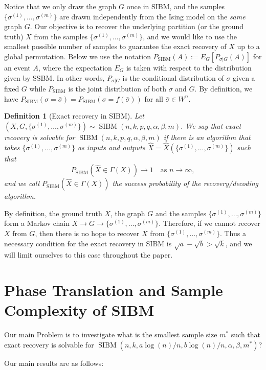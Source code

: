 \documentclass[conference]{IEEEtran}
\newtheorem{definition}{Definition}%
\DeclareMathOperator{\SIBM}{SIBM}
\begin{document}
Notice that we only draw the graph $G$ once in SIBM, and the samples $\{\sigma^{(1)},\dots,\sigma^{(m)}\}$ are drawn independently from the Ising model on the {\em same} graph $G$.
Our objective is to recover the underlying partition (or the ground truth) $X$ from the samples $\{\sigma^{(1)},\dots,\sigma^{(m)}\}$, and we would like to use the smallest possible number of samples to guarantee the exact recovery of $X$ up to a global permutation.
Below we use the notation $P_{\SIBM}(A):=E_G[P_{\sigma|G}(A)]$ for an event $A$, where the expectation $E_G$ is taken with respect to the distribution given by SSBM. In other words, $P_{\sigma|G}$ is the conditional distribution of  $\sigma$ given a fixed $G$ while $P_{\SIBM}$ is the joint distribution of both $\sigma$ and $G$.
By definition, we have $P_{\SIBM}(\sigma=\bar{\sigma})=P_{\SIBM}(\sigma=f(\bar{\sigma}))$ for all $\bar{\sigma}\in W^n$.


\begin{definition}[Exact recovery in SIBM]
Let $(X,G,\{\sigma^{(1)},\dots,\sigma^{(m)}\}) \sim \SIBM(n,k,p,q,\alpha,\beta,m)$.
We say that exact recovery is solvable for $\SIBM(n,k,p,q,\alpha,\beta,m)$ if there is an algorithm that takes $\{\sigma^{(1)},\dots,\sigma^{(m)}\}$ as inputs and outputs $\hat{X}=\hat{X}(\{\sigma^{(1)},\dots,\sigma^{(m)}\})$ such that
$$
P_{\SIBM}(\hat{X} \in \Gamma(X)) \to 1
\text{~~~as~} n\to\infty ,
$$
and we call $P_{\SIBM}(\hat{X} \in \Gamma(X))$ the success probability of the recovery/decoding algorithm.
\end{definition}

By definition, the ground truth $X$, the graph $G$ and the samples $\{\sigma^{(1)},\dots,\sigma^{(m)}\}$ form a Markov chain $X\to G\to \{\sigma^{(1)},\dots,\sigma^{(m)}\}$. Therefore, if we cannot recover $X$ from $G$, then there is no hope to recover $X$ from $\{\sigma^{(1)},\dots,\sigma^{(m)}\}$. Thus a necessary condition for the exact recovery in SIBM is $\sqrt{a}-\sqrt{b}> \sqrt{k}$, and we will limit ourselves to this case throughout the paper.

\section{Phase Translation and Sample Complexity of SIBM}\label{s:trans}
Our main Problem is to investigate what is the smallest sample size $m^\ast$ such that exact recovery is solvable for $\SIBM(n,k, a\log(n)/n, b\log(n)/n,\alpha,\beta,m^\ast)$?

Our main results are as follows:
\end{document}
